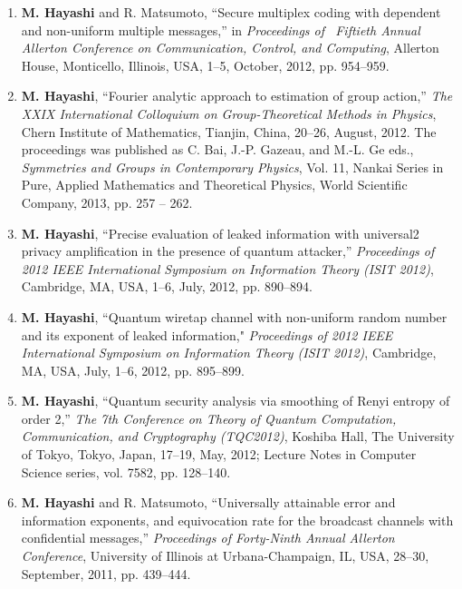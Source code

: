 \documentclass[a4paper,12pt,oneside]{article}
\begin{document}
\begin{enumerate}
\item  \textbf{M. Hayashi} and R. Matsumoto, 
``Secure multiplex coding with dependent and non-uniform multiple messages,''
in  \emph{Proceedings of \ Fiftieth Annual Allerton Conference on Communication, Control, and Computing}, 
Allerton House, Monticello, Illinois, USA, 1--5, October, 2012, pp. 954--959.

\item 
\textbf{M. Hayashi}, ``Fourier analytic approach to estimation of group action,'' 
{\em The XXIX International Colloquium on Group-Theoretical Methods in Physics}, 
Chern Institute of Mathematics, Tianjin, China, 20--26, August, 2012.
The proceedings was published as 
C. Bai, J.-P. Gazeau, and M.-L. Ge eds.,
{\em Symmetries and Groups in Contemporary Physics},
Vol. 11, Nankai Series in Pure, Applied Mathematics and Theoretical Physics,
World Scientific Company, 2013, pp. 257 -- 262.

\item 
\textbf{M. Hayashi}, 
``Precise evaluation of leaked information with universal2 privacy amplification in the presence of quantum attacker,'' 
{\em Proceedings of 2012 IEEE International Symposium on Information Theory (ISIT 2012)}, 
Cambridge, MA, USA, 1--6, July, 2012, pp. 890--894. 

\item   \textbf{M. Hayashi}, 
``Quantum wiretap channel with non-uniform random number and its exponent of leaked information," 
{\em Proceedings of 2012 IEEE International Symposium on Information Theory (ISIT 2012)}, 
Cambridge, MA, USA, July, 1--6, 2012, pp. 895--899. 

\item   \textbf{M. Hayashi}, 
``Quantum security analysis via smoothing of Renyi entropy of order 2,''
{\em The 7th Conference on Theory of Quantum Computation, Communication, and Cryptography (TQC2012)}, 
Koshiba Hall, The University of Tokyo, Tokyo, Japan, 17--19, May, 2012; 
Lecture Notes in Computer Science series, vol. 7582, pp. 128--140.

\item   \textbf{M. Hayashi} and R. Matsumoto, 
``Universally attainable error and information exponents, and equivocation rate for the broadcast channels with confidential messages,''
{\em Proceedings of Forty-Ninth Annual Allerton Conference}, 
University of Illinois at Urbana-Champaign, IL, USA, 28--30, September, 2011, pp. 439--444. 


\end{enumerate}
\end{document}

